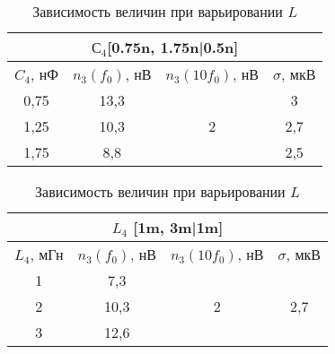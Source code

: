 \begin{enumerate}
\begin{table}[!h]
		\begin{tabular}{|cccc|}
			\hline
			\multicolumn{4}{|c|}{$ С_4 $[0.75n, 1.75n|0.5n]}                                                                             \\ \hline
			\multicolumn{1}{|c|}{$ C_4 $, нФ} & \multicolumn{1}{c|}{$ n_3(f_0) $, нВ} & \multicolumn{1}{c|}{$ n_3(10f_0) $, нВ}     & $ \sigma $, мкВ \\ \hline
			\multicolumn{1}{|c|}{0,75}    & \multicolumn{1}{c|}{13,3}         & \multicolumn{1}{c|}{\multirow{3}{*}{2}} & 3          \\ \cline{1-2} \cline{4-4} 
			\multicolumn{1}{|c|}{1,25}    & \multicolumn{1}{c|}{10,3}         & \multicolumn{1}{c|}{}                   & 2,7        \\ \cline{1-2} \cline{4-4} 
			\multicolumn{1}{|c|}{1,75}    & \multicolumn{1}{c|}{8,8}          & \multicolumn{1}{c|}{}                   & 2,5        \\ \hline
		\end{tabular}
		\caption{Зависимость величин при варьировании $ C $}
		\label{tab:tabel_15}
		
		\begin{tabular}{|cccc|}
			\hline
			\multicolumn{4}{|c|}{$ L_4 $ [1m, 3m|1m]}                                                                                                \\ \hline
			\multicolumn{1}{|c|}{$ L_4 $, мГн} & \multicolumn{1}{c|}{$ n_3(f_0) $, нВ} & \multicolumn{1}{c|}{$ n_3(10f_0) $, нВ}     & $ \sigma $, мкВ           \\ \hline
			\multicolumn{1}{|c|}{1}        & \multicolumn{1}{c|}{7,3}          & \multicolumn{1}{c|}{\multirow{3}{*}{2}} & \multirow{3}{*}{2,7} \\ \cline{1-2}
			\multicolumn{1}{|c|}{2}        & \multicolumn{1}{c|}{10,3}         & \multicolumn{1}{c|}{}                   &                      \\ \cline{1-2}
			\multicolumn{1}{|c|}{3}        & \multicolumn{1}{c|}{12,6}         & \multicolumn{1}{c|}{}                   &                      \\ \hline
		\end{tabular}
		\caption{Зависимость величин при варьировании $ L $}
		\label{tab:tabel_16}
		
	\end{table}
	
\end{enumerate}

\newpage


